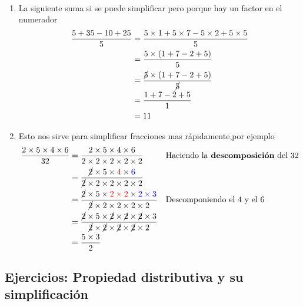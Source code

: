 \begin{ejemplo}{\ \\}
\begin{enumerate}[label=\Alph*)]
          	\item La siguiente suma si se puede simplificar pero porque hay un factor en el numerador 
          	\begin{align*}
          		\frac{5+35-10+25}{5} &= \frac{5\times 1 + 5\times 7 - 5\times 2 +5\times 5}{5}\\
          		&= \frac{5\times(1+7-2+5)}{5}\\
          		&= \frac{\cancel{5}\times(1+7-2+5)}{\cancel{5}}\\
          		&=\frac{1+7-2+5}{1} \\
          		&= 11
          	\end{align*}
          	
          	\item Esto nos sirve para simplificar fracciones mas rápidamente,por ejemplo
          			\begin{align*}
							\frac{2\times 5\times 4\times 6}{32} &= \frac{2\times 5\times 4\times 6}{2\times 2\times 2\times 2\times 2} && \text{Haciendo la \textbf{descomposición} del 32} \\
							&= \frac{\cancel{2}\times 5\times \color{red}{4}\color{black}\times \color{blue}6\color{black}}{\cancel{2}\times 2\times 2\times 2\times 2} 	\\
							&= \frac{\cancel{2}\times 5\times \color{red} 2\times 2\color{black} \times \color{blue} 2\times 3 \color{black}}{\cancel{2}\times 2\times 2\times 2\times 2} 	&& \text{Descomponiendo el 4 y el 6} \\
							&= \frac{\cancel{2}\times 5\times  \cancel{2}\times \cancel{2}\times  \cancel{2}\times 3 }{\cancel{2}\times \cancel{2}\times \cancel{2}\times \cancel{2}\times 2} \\
							&= \frac{5\times 3}{2}							
          			\end{align*}
          			
          	

		\end{enumerate}
\end{ejemplo}

\newpage

\begin{center}
	\vspace{-1cm}
	\subsection{Ejercicios:  Propiedad distributiva y su simplificación}\label{ejercicios_subsubsection_distributiva}
\end{center}


